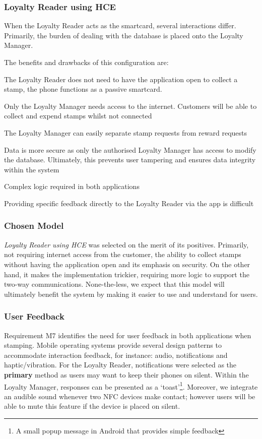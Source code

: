 \subsubsection{Loyalty Reader using HCE}
When the Loyalty Reader acts as the smartcard, several interactions differ. Primarily, the burden of dealing with the database is placed onto the Loyalty Manager.

The benefits and drawbacks of this configuration are: 
\begin{description}[leftmargin=!,labelwidth=\widthof{\bfseries small}]
    \item[+] The Loyalty Reader does not need to have the application open to collect a stamp, the phone functions as a passive smartcard.
    \item[+] Only the Loyalty Manager needs access to the internet. Customers will be able to collect and expend stamps whilst not connected
    \item[+] The Loyalty Manager can easily separate stamp requests from reward requests
    \item[+] Data is more secure as only the authorised Loyalty Manager has access to modify the database. Ultimately, this prevents user tampering and ensures data integrity within the system
    \item[---] Complex logic required in both applications
    \item[---] Providing specific feedback directly to the Loyalty Reader via the app is difficult
\end{description}

\subsubsection{Chosen Model}
\emph{Loyalty Reader using HCE} was selected on the merit of its positives. Primarily, not requiring internet access from the customer, the ability to collect stamps without having the application open and its emphasis on security. On the other hand, it makes the implementation trickier, requiring more logic to support the two-way communications. None-the-less, we expect that this model will ultimately benefit the system by making it easier to use and understand for users.

\subsubsection{User Feedback}
Requirement M7 identifies the need for user feedback in both applications when stamping. Mobile operating systems provide several design patterns to accommodate interaction feedback, for instance: audio, notifications and haptic/vibration. For the Loyalty Reader, notifications were selected as the \textbf{primary} method as users may want to keep their phones on silent. Within the Loyalty Manager, responses can be presented as a `toast'\cite{toast}\footnote{A small popup message in Android that provides simple feedback}. Moreover, we integrate an audible sound whenever two NFC devices make contact; however users will be able to mute this feature if the device is placed on silent. 

